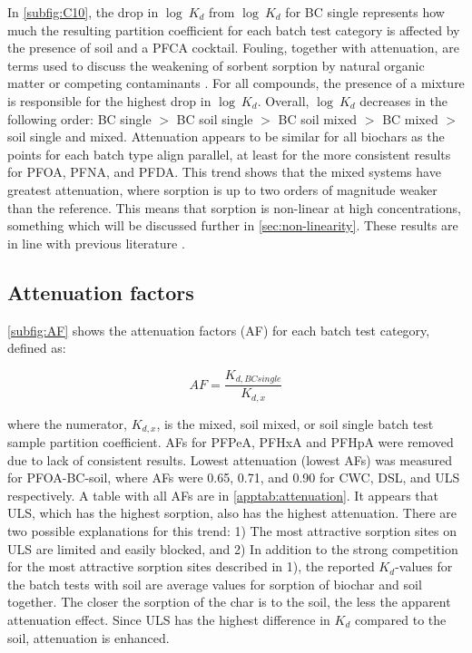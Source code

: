 In \cref{subfig:C10}, the drop in $\log~K_d$ from $\log~K_d$ for BC single represents how much the resulting partition coefficient for each batch test category is affected by the presence of soil and a PFCA cocktail. Fouling, together with attenuation, are terms used to discuss the weakening of sorbent sorption by natural organic matter or competing contaminants \citep{Werner2006}. For all compounds, the presence of a mixture is responsible for the highest drop in $\log~K_d$. Overall, $\log~K_d$ decreases in the following order: BC single $>$ BC soil single $>$ BC soil mixed $>$ BC mixed $>$ soil single and mixed. Attenuation appears to be similar for all biochars as the points for each batch type align parallel, at least for the more consistent results for PFOA, PFNA, and PFDA. This trend shows that the mixed systems have greatest attenuation, where sorption is up to two orders of magnitude weaker than the reference. This means that sorption is non-linear at high concentrations, something which will be discussed further in \cref{sec:non-linearity}. These results are in line  with previous literature \citep{deng2010removal, zhou2010sorption}.

\subsection{Attenuation factors}
\cref{subfig:AF} shows the attenuation factors (AF) for each batch test category, defined as:

\begin{equation} \label{eq:AF}
    AF = \frac{K_{d,BC single}}{K_{d,x}}
\end{equation}

where the numerator, $K_{d,x}$, is the mixed, soil mixed, or soil single batch test sample partition coefficient. AFs for PFPeA, PFHxA and PFHpA were removed due to lack of consistent results. Lowest attenuation (lowest AFs) was measured for PFOA-BC-soil, where AFs were 0.65, 0.71, and 0.90 for CWC, DSL, and ULS respectively. A table with all AFs are in \cref{apptab:attenuation}. It appears that ULS, which has the highest sorption, also has the highest attenuation. There are two possible explanations for this trend: 1) The most attractive sorption sites on ULS are limited and easily blocked, and 2) In addition to the strong competition for the most attractive sorption sites described in 1), the reported $K_d$-values for the batch tests with soil are average values for sorption of biochar and soil together. The closer the sorption of the char is to the soil, the less the apparent attenuation effect. Since ULS has the highest difference in $K_d$ compared to the soil, attenuation is enhanced.


